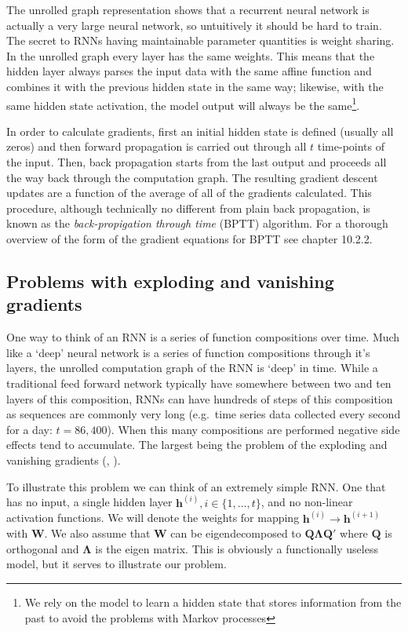 \documentclass[]{book}
\let\rmarkdownfootnote\footnote%
\def\footnote{\protect\rmarkdownfootnote}
\theoremstyle{definition}
\theoremstyle{definition}
\theoremstyle{definition}
\theoremstyle{remark}
\begin{document}
The unrolled graph representation shows that a recurrent neural network
is actually a very large neural network, so untuitively it should be
hard to train. The secret to RNNs having maintainable parameter
quantities is weight sharing. In the unrolled graph every layer has the
same weights. This means that the hidden layer always parses the input
data with the same affine function and combines it with the previous
hidden state in the same way; likewise, with the same hidden state
activation, the model output will always be the same\footnote{We rely on
  the model to learn a hidden state that stores information from the
  past to avoid the problems with Markov processes}.

In order to calculate gradients, first an initial hidden state is
defined (usually all zeros) and then forward propagation is carried out
through all \(t\) time-points of the input. Then, back propagation
starts from the last output and proceeds all the way back through the
computation graph. The resulting gradient descent updates are a function
of the average of all of the gradients calculated. This procedure,
although technically no different from plain back propagation, is known
as the \emph{back-propigation through time} (BPTT) algorithm. For a
thorough overview of the form of the gradient equations for BPTT see
\citet{goodfellow_DL} chapter 10.2.2.

\subsection{Problems with exploding and vanishing
gradients}\label{problems-with-exploding-and-vanishing-gradients}

One way to think of an RNN is a series of function compositions over
time. Much like a `deep' neural network is a series of function
compositions through it's layers, the unrolled computation graph of the
RNN is `deep' in time. While a traditional feed forward network
typically have somewhere between two and ten layers of this composition,
RNNs can have hundreds of steps of this composition as sequences are
commonly very long (e.g.~time series data collected every second for a
day: \(t= 86,400\)). When this many compositions are performed negative
side effects tend to accumulate. The largest being the problem of the
exploding and vanishing gradients (\citet{vanishing_gradient},
\citet{bengio_gradient}).

To illustrate this problem we can think of an extremely simple RNN. One
that has no input, a single hidden layer
\(\mathbf{h}^{(i)}, i \in \{1, ..., t\}\), and no non-linear activation
functions. We will denote the weights for mapping
\(\mathbf{h}^{(i)} \to \mathbf{h}^{(i + 1)}\) with \(\mathbf{W}\). We
also assume that \(\mathbf{W}\) can be eigendecomposed to
\(\mathbf{Q}\mathbf{\Lambda}\mathbf{Q}'\) where \(\mathbf{Q}\) is
orthogonal and \(\mathbf{\Lambda}\) is the eigen matrix. This is
obviously a functionally useless model, but it serves to illustrate our
problem.
\end{document}
